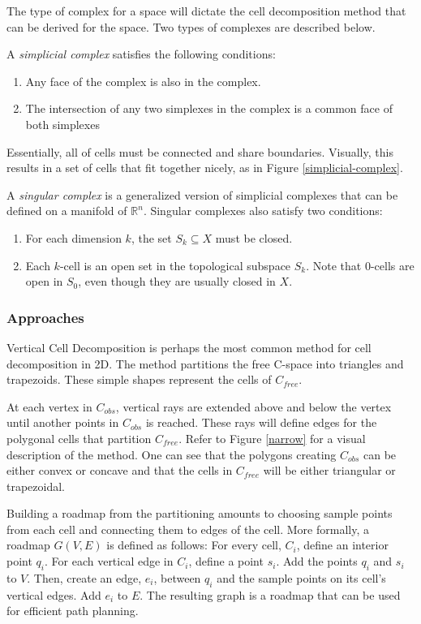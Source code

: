 \documentclass[10pt,conference]{ieeeconf}
\begin{document}
The type of complex for a space will dictate the cell decomposition method that can be derived for the space. Two types of complexes are described below.

A \emph{simplicial complex} satisfies the following conditions:

\begin{enumerate}
\item Any face of the complex is also in the complex.
\item The intersection of any two simplexes in the complex is a common face of both simplexes
\end{enumerate}

Essentially, all of cells must be connected and share boundaries. Visually, this results in a set of cells that fit together nicely, as in Figure \ref{simplicial-complex}. 

A \emph{singular complex} is a generalized version of simplicial complexes that can be defined on a manifold of $\mathbb{R}^n$. Singular complexes also satisfy two conditions:

\begin{enumerate}
\item For each dimension $k$, the set $S_k \subseteq X$ must be closed. 
\item Each $k$-cell is an open set in the topological subspace $S_k$. Note that 0-cells are open in $S_0$, even though they are usually closed in $X$.
\end{enumerate} 

\subsubsection{Approaches}

Vertical Cell Decomposition \cite{vert_cell_decomp} is perhaps the most common method for cell decomposition in 2D. The method partitions the free C-space into triangles and trapezoids. These simple shapes represent the cells of $C_{free}$. 

At each vertex in $C_{obs}$, vertical rays are extended above and below the vertex until another points in $C_{obs}$ is reached. These rays will define edges for the polygonal cells that partition $C_{free}$. Refer to Figure \ref{narrow} for a visual description of the method. One can see that the polygons creating $C_{obs}$ can be either convex or concave and that the cells in $C_{free}$ will be either triangular or trapezoidal. 

Building a roadmap from the partitioning amounts to choosing sample points from each cell and connecting them to edges of the cell. More formally, a roadmap $G(V,E)$ is defined as follows: For every cell, $C_i$, define an interior point $q_i$. For each vertical edge in $C_i$, define a point $s_i$. Add the points $q_i$ and $s_i$ to $V$. Then, create an edge, $e_i$, between $q_i$ and the sample points on its cell's vertical edges. Add $e_i$ to $E$. The resulting graph is a roadmap that can be used for efficient path planning.
\end{document}
